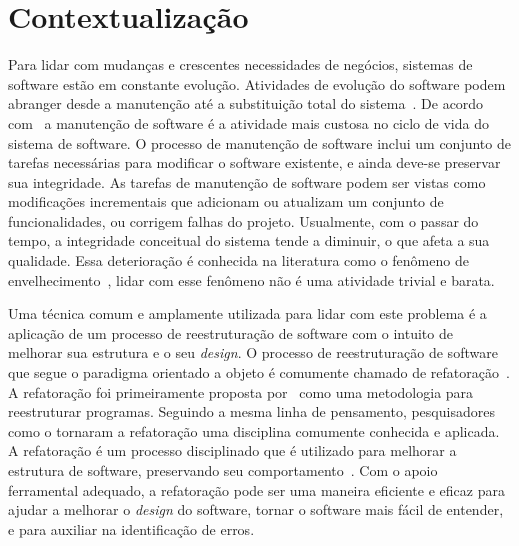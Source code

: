 
\section{Contextualização}\label{sec:contexto}


Para lidar com mudanças e crescentes necessidades de negócios, sistemas de software estão em constante evolução. Atividades de evolução do software podem abranger desde a manutenção até a substituição total do sistema~\cite{seacord_2003}. De acordo com~ a manutenção de software é a atividade mais custosa no ciclo de vida do sistema de software. O processo de manutenção de software inclui um conjunto de tarefas necessárias para modificar o software existente, e ainda deve-se preservar sua integridade. As tarefas de manutenção de software podem ser vistas como modificações incrementais que adicionam ou atualizam um conjunto de funcionalidades, ou corrigem falhas do projeto. Usualmente, com o passar do tempo, a integridade conceitual do sistema tende a diminuir, o que afeta a sua qualidade. Essa deterioração é conhecida na literatura como o fenômeno de envelhecimento~\cite{Fowler1999}, lidar com esse fenômeno não é uma atividade trivial e barata.

Uma técnica comum e amplamente utilizada para lidar com este problema é a aplicação de um processo de reestruturação de software com o intuito de melhorar sua estrutura e o seu \emph{design}. O processo de reestruturação de software que segue o paradigma orientado a objeto é comumente chamado de refatoração~\cite{OPDYKE_1992, Fowler1999, Mens04}. A refatoração foi primeiramente proposta por~ como uma metodologia para reestruturar programas. Seguindo a mesma linha de pensamento, pesquisadores como o  tornaram a refatoração uma disciplina comumente conhecida e aplicada. A refatoração é um processo disciplinado que é utilizado para melhorar a estrutura de software, preservando seu comportamento~\cite{Fowler1999}. Com o apoio ferramental adequado, a refatoração pode ser uma maneira eficiente e eficaz para ajudar a melhorar o \emph{design} do software, tornar o software mais fácil de entender, e para auxiliar na identificação de erros. %


